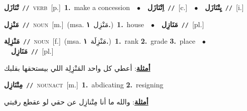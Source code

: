 \documentclass[10pt,a4paper,twoside]{article} %
\begin{document}
\begin{multicols}{2}
{\setlength\topsep{0pt}\textbf{\foreignlanguage{arabic}{تْنَازَل}}\ {\color{gray}\texttt{//}\color{black}}\ \textsc{verb}\ [p.]\ \textbf{1.}~make a concession\ \ $\bullet$\ \ \setlength\topsep{0pt}\textbf{\foreignlanguage{arabic}{اِتْنَازَل}}\ {\color{gray}\texttt{//}\color{black}}\ [c.]\ \ $\bullet$\ \ \setlength\topsep{0pt}\textbf{\foreignlanguage{arabic}{يِتْنَازَل}}\ {\color{gray}\texttt{//}\color{black}}\ [i.]\ } \vspace{2mm}

{\setlength\topsep{0pt}\textbf{\foreignlanguage{arabic}{مَنْزِل}}\ {\color{gray}\texttt{//}\color{black}}\ \textsc{noun}\ [m.]\ \color{gray}(msa. \foreignlanguage{arabic}{مَنْزِل}~\foreignlanguage{arabic}{\textbf{١.}})\color{black}\ \textbf{1.}~house\ \ $\bullet$\ \ \setlength\topsep{0pt}\textbf{\foreignlanguage{arabic}{مَنَازِل}}\ {\color{gray}\texttt{//}\color{black}}\ [pl.]\ } \vspace{2mm}

{\setlength\topsep{0pt}\textbf{\foreignlanguage{arabic}{مَنْزِلِة}}\ {\color{gray}\texttt{//}\color{black}}\ \textsc{noun}\ [f.]\ \color{gray}(msa. \foreignlanguage{arabic}{مَنْزِلَة}~\foreignlanguage{arabic}{\textbf{١.}})\color{black}\ \textbf{1.}~rank  \textbf{2.}~grade  \textbf{3.}~place\ \ $\bullet$\ \ \setlength\topsep{0pt}\textbf{\foreignlanguage{arabic}{مَنَازِل}}\ {\color{gray}\texttt{//}\color{black}}\ [pl.]\  \begin{flushright}\color{gray}\foreignlanguage{arabic}{\textbf{\underline{\foreignlanguage{arabic}{أمثلة}}}: أعطي كل واحد المَنْزِلِة اللي بيستحقها بقلبك}\end{flushright}\color{black}} \vspace{2mm}

{\setlength\topsep{0pt}\textbf{\foreignlanguage{arabic}{مِتْنَازِل}}\ {\color{gray}\texttt{//}\color{black}}\ \textsc{noun\textunderscore act}\ [m.]\ \textbf{1.}~abdicating  \textbf{2.}~resigning\  \begin{flushright}\color{gray}\foreignlanguage{arabic}{\textbf{\underline{\foreignlanguage{arabic}{أمثلة}}}: والله ما أنا مِتْنازِل عن حقي لو عقطع رقبتي}\end{flushright}\color{black}} \vspace{2mm}


\end{multicols}
\end{document}
